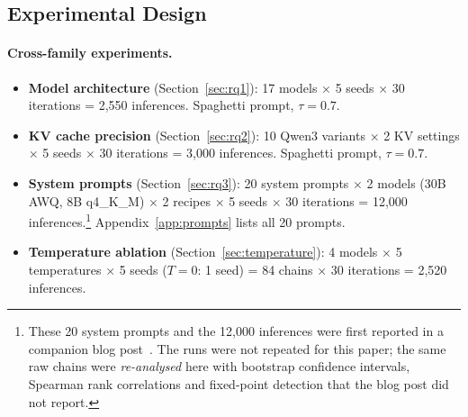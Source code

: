 \documentclass[11pt]{article}
\begin{document}
\subsection{Experimental Design}
\label{sec:design}

\paragraph{Cross-family experiments.}
\begin{itemize}[leftmargin=*]
  \item \textbf{Model architecture} (Section~\ref{sec:rq1}): 17 models
        $\times$ 5 seeds $\times$ 30 iterations = 2,550 inferences.
        Spaghetti prompt, $\tau=0.7$.
  \item \textbf{KV cache precision} (Section~\ref{sec:rq2}): 10 Qwen3 variants
        $\times$ 2 KV settings $\times$ 5 seeds $\times$ 30 iterations
        = 3,000 inferences. Spaghetti prompt, $\tau=0.7$.
  \item \textbf{System prompts} (Section~\ref{sec:rq3}): 20 system prompts
        $\times$ 2 models (30B AWQ, 8B q4\_K\_M) $\times$ 2 recipes
        $\times$ 5 seeds $\times$ 30 iterations = 12,000
        inferences.\footnote{These 20 system prompts and the 12{,}000
        inferences were first reported in a companion blog
        post~\citep{smith2026sysprompt}. The runs were not repeated
        for this paper; the same raw chains were \emph{re-analysed} here with
        bootstrap confidence intervals, Spearman rank correlations and
        fixed-point detection that the blog post did not report.}
        Appendix~\ref{app:prompts} lists all 20 prompts.
  \item \textbf{Temperature ablation} (Section~\ref{sec:temperature}):
        4 models $\times$ 5 temperatures $\times$ 5 seeds ($T=0$: 1 seed)
        = 84 chains $\times$ 30 iterations = 2,520 inferences.
\end{itemize}
\end{document}
